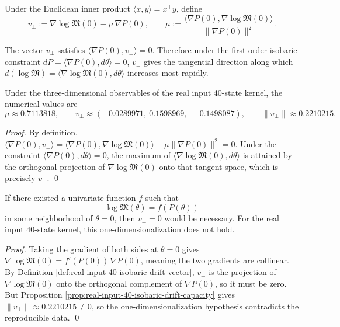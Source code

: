 \begin{definition}\label{def:real-input-40-isobaric-drift-vector}
Under the Euclidean inner product \(\langle x,y\rangle=x^\top y\), define
\[
v_\perp
:=\nabla\log\mathfrak{M}(0)-\mu\,\nabla P(0),
\qquad
\mu:=\frac{\langle\nabla P(0),\nabla\log\mathfrak{M}(0)\rangle}{\|\nabla P(0)\|^2}.
\]
\end{definition}

\begin{proposition}\label{prop:real-input-40-isobaric-drift-capacity}
The vector \(v_\perp\) satisfies \( \langle\nabla P(0),v_\perp\rangle=0\).
Therefore under the first-order isobaric constraint \(dP=\langle\nabla P(0),d\theta\rangle=0\), \(v_\perp\) gives the tangential direction along which \(d(\log\mathfrak{M})=\langle\nabla\log\mathfrak{M}(0),d\theta\rangle\) increases most rapidly.
\par
Under the three-dimensional observables of the real input 40-state kernel, the numerical values are
\[
\mu\approx 0.7113818,\qquad
v_\perp\approx(-0.0289971,\ 0.1598969,\ -0.1498087),
\qquad
\|v_\perp\|\approx 0.2210215.
\]
\end{proposition}
\begin{proof}
By definition, \(\langle\nabla P(0),v_\perp\rangle=\langle\nabla P(0),\nabla\log\mathfrak{M}(0)\rangle-\mu\|\nabla P(0)\|^2=0\).
Under the constraint \(\langle\nabla P(0),d\theta\rangle=0\), the maximum of \(\langle\nabla\log\mathfrak{M}(0),d\theta\rangle\) is attained by the orthogonal projection of \(\nabla\log\mathfrak{M}(0)\) onto that tangent space, which is precisely \(v_\perp\). \qed
\end{proof}

\begin{corollary}\label{cor:real-input-40-logM-not-just-P}
If there existed a univariate function \(f\) such that
\[
\log\mathfrak{M}(\theta)=f(P(\theta))
\]
in some neighborhood of \(\theta=0\), then \(v_\perp=0\) would be necessary. For the real input 40-state kernel, this one-dimensionalization does not hold.
\end{corollary}
\begin{proof}
Taking the gradient of both sides at \(\theta=0\) gives
\(
\nabla\log\mathfrak{M}(0)=f'(P(0))\,\nabla P(0)
\),
meaning the two gradients are collinear.
By Definition \ref{def:real-input-40-isobaric-drift-vector}, \(v_\perp\) is the projection of \(\nabla\log\mathfrak{M}(0)\) onto the orthogonal complement of \(\nabla P(0)\), so it must be zero.
But Proposition \ref{prop:real-input-40-isobaric-drift-capacity} gives \(\|v_\perp\|\approx 0.2210215\neq 0\), so the one-dimensionalization hypothesis contradicts the reproducible data. \qed
\end{proof}


